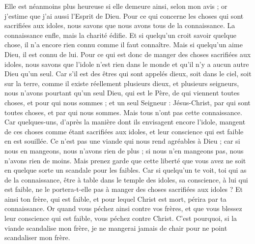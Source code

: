 \begin{multicols}{2}
Elle est néanmoins plus heureuse si elle demeure ainsi, selon mon avis ; or j'estime que j'ai aussi l'Esprit de Dieu.
\VerseOne{}Pour ce qui concerne les choses qui sont sacrifiées aux idoles, nous savons que nous avons tous de la connaissance. La connaissance enfle, mais la charité édifie.
Et si quelqu'un croit savoir quelque chose, il n'a encore rien connu comme il faut connaître.
Mais si quelqu'un aime Dieu, il est connu de lui.
Pour ce qui est donc de manger des choses sacrifiées aux idoles, nous savons que l'idole n'est rien dans le monde et qu'il n'y a aucun autre Dieu qu’un seul.
Car s’il est des êtres qui sont appelés dieux, soit dans le ciel, soit sur la terre, comme il existe réellement plusieurs dieux, et plusieurs seigneurs,
nous n’avons pourtant qu'un seul Dieu, qui est le Père, de qui viennent toutes choses, et pour qui nous sommes ; et un seul Seigneur : Jésus-Christ, par qui sont toutes choses, et par qui nous sommes.
Mais tous n’ont pas cette connaissance. Car quelques-uns, d’après la manière dont ils envisagent encore l'idole, mangent de ces choses comme étant sacrifiées aux idoles, et leur conscience qui est faible en est souillée.
Ce n’est pas une viande qui nous rend agréables à Dieu ; car si nous en mangeons, nous n'avons rien de plus ; si nous n’en mangeons pas, nous n’avons rien de moins.
Mais prenez garde que cette liberté que vous avez ne soit en quelque sorte un scandale pour les faibles.
Car si quelqu'un te voit, toi qui as de la connaissance, être à table dans le temple des idoles, sa conscience, à lui qui est faible, ne le portera-t-elle pas à manger des choses sacrifiées aux idoles ?
Et ainsi ton frère, qui est faible, et pour lequel Christ est mort, périra par ta connaissance.
Or quand vous péchez ainsi contre vos frères, et que vous blessez leur conscience qui est faible, vous péchez contre Christ.
C'est pourquoi, si la viande scandalise mon frère, je ne mangerai jamais de chair pour ne point scandaliser mon frère.

\end{multicols}
